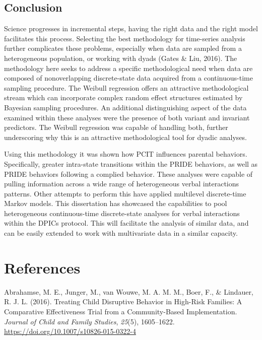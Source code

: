 \documentclass[12pt]{./styles/outhesis}
\begin{document}
\section{Conclusion}
Science progresses in incremental steps, having the right data and the
right model facilitates this process. Selecting the best methodology for
time-series analysis further complicates these problems, especially when
data are sampled from a heterogeneous population, or working with dyads
(Gates \& Liu, 2016). The methodology here seeks to address a specific
methodological need when data are composed of nonoverlapping
discrete-state data acquired from a continuous-time sampling procedure.
The Weibull regression offers an attractive methodological stream which
can incorporate complex random effect structures estimated by Bayesian
sampling procedures. An additional distinguishing aspect of the data
examined within these analyses were the presence of both variant and
invariant predictors. The Weibull regression was capable of handling
both, further underscoring why this is an attractive methodological tool
for dyadic analyses.

Using this methodology it was shown how PCIT influences parental
behaviors. Specifically, greater intra-state transitions within the
PRIDE behaviors, as well as PRIDE behaviors following a complied
behavior. These analyses were capable of pulling information across a
wide range of heterogeneous verbal interactions patterns. Other attempts
to perform this have applied multilevel discrete-time Markov models.
This dissertation has showcased the capabilities to pool heterogeneous
continuous-time discrete-state analyses for verbal interactions within
the DPICs protocol. This will facilitate the analysis of similar data,
and can be easily extended to work with multivariate data in a similar
capacity.

\newpage
%
\chapter{References}

\leavevmode{}%
Abrahamse, M. E., Junger, M., van Wouwe, M. A. M. M., Boer, F., \&
Lindauer, R. J. L. (2016). Treating {Child Disruptive Behavior} in
{High-Risk Families}: {A Comparative Effectiveness Trial} from a
{Community-Based Implementation}. \emph{Journal of Child and Family
Studies}, \emph{25}(5), 1605--1622.
\url{https://doi.org/10.1007/s10826-015-0322-4}
\end{document}
